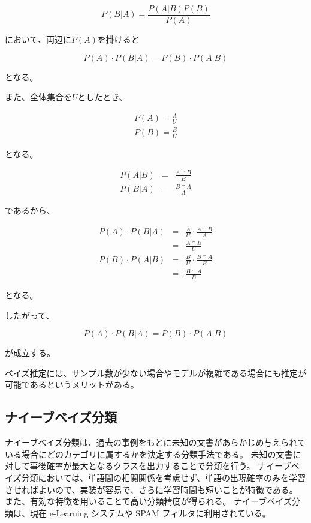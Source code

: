 \documentclass[11pt,a4j]{jsarticle}
\begin{document}
\begin{equation}
P(B|A)=\frac{P(A|B)P(B)}{P(A)}
\end{equation}

において、両辺に$P(A)$を掛けると

\begin{equation}
P(A) \cdot P(B|A)=P(B) \cdot P(A|B)
\end{equation}

となる。

また、全体集合を$U$としたとき、

\begin{eqnarray*}
P(A) = \frac{A}{U}\\
P(B) = \frac{B}{U}
\end{eqnarray*}

となる。

\begin{eqnarray*}
P(A|B) & = & \frac{A \cap B}{B}\\
P(B|A) & = & \frac{B \cap A}{A}
\end{eqnarray*}

であるから、

\begin{eqnarray*}
P(A) \cdot P(B|A) & = & \frac{A}{U} \cdot \frac{A \cap B}{A}\\
               & = & \frac{A \cap B}{U}\\
P(B) \cdot P(A|B)  & = &\frac{B}{U} \cdot \frac{B \cap A}{B}\\
                  & = & \frac{B \cap A}{B}
\end{eqnarray*}

となる。

したがって、

\[ P(A) \cdot P(B|A)=P(B) \cdot P(A|B) \]

が成立する。

ベイズ推定には、サンプル数が少ない場合やモデルが複雑である場合にも推定が可能であるというメリットがある。

 \subsection{ナイーブベイズ分類}\label{sec:defnaivebayes}
ナイーブベイズ分類は、過去の事例をもとに未知の文書があらかじめ与えられている場合にどのカテゴリに属するかを決定する分類手法である。
未知の文書に対して事後確率が最大となるクラスを出力することで分類を行う。
ナイーブベイズ分類においては、単語間の相関関係を考慮せず、単語の出現確率のみを学習させればよいので、実装が容易で、さらに学習時間も短いことが特徴である。
また、有効な特徴を用いることで高い分類精度が得られる。
ナイーブベイズ分類は、現在 e-Learning システムや SPAM フィルタに利用されている。
\end{document}
